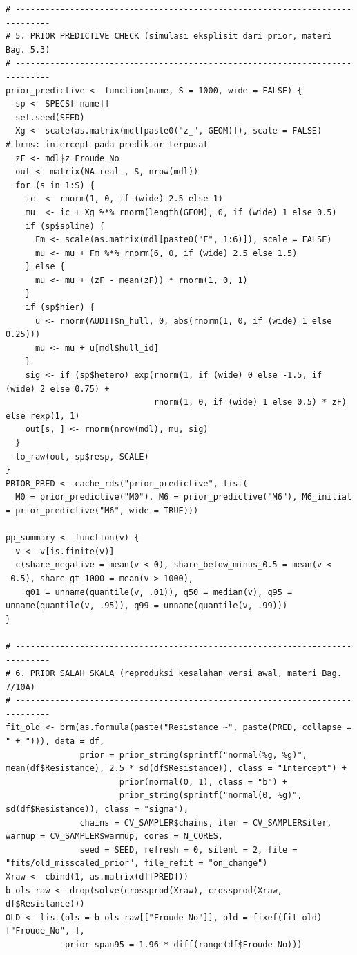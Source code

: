 \documentclass[
]{article}
\begin{document}
\begin{verbatim}
# -----------------------------------------------------------------------------
# 5. PRIOR PREDICTIVE CHECK (simulasi eksplisit dari prior, materi Bag. 5.3)
# -----------------------------------------------------------------------------
prior_predictive <- function(name, S = 1000, wide = FALSE) {
  sp <- SPECS[[name]]
  set.seed(SEED)
  Xg <- scale(as.matrix(mdl[paste0("z_", GEOM)]), scale = FALSE)          # brms: intercept pada prediktor terpusat
  zF <- mdl$z_Froude_No
  out <- matrix(NA_real_, S, nrow(mdl))
  for (s in 1:S) {
    ic  <- rnorm(1, 0, if (wide) 2.5 else 1)
    mu  <- ic + Xg %*% rnorm(length(GEOM), 0, if (wide) 1 else 0.5)
    if (sp$spline) {
      Fm <- scale(as.matrix(mdl[paste0("F", 1:6)]), scale = FALSE)
      mu <- mu + Fm %*% rnorm(6, 0, if (wide) 2.5 else 1.5)
    } else {
      mu <- mu + (zF - mean(zF)) * rnorm(1, 0, 1)
    }
    if (sp$hier) {
      u <- rnorm(AUDIT$n_hull, 0, abs(rnorm(1, 0, if (wide) 1 else 0.25)))
      mu <- mu + u[mdl$hull_id]
    }
    sig <- if (sp$hetero) exp(rnorm(1, if (wide) 0 else -1.5, if (wide) 2 else 0.75) +
                              rnorm(1, 0, if (wide) 1 else 0.5) * zF) else rexp(1, 1)
    out[s, ] <- rnorm(nrow(mdl), mu, sig)
  }
  to_raw(out, sp$resp, SCALE)
}
PRIOR_PRED <- cache_rds("prior_predictive", list(
  M0 = prior_predictive("M0"), M6 = prior_predictive("M6"), M6_initial = prior_predictive("M6", wide = TRUE)))

pp_summary <- function(v) {
  v <- v[is.finite(v)]
  c(share_negative = mean(v < 0), share_below_minus_0.5 = mean(v < -0.5), share_gt_1000 = mean(v > 1000),
    q01 = unname(quantile(v, .01)), q50 = median(v), q95 = unname(quantile(v, .95)), q99 = unname(quantile(v, .99)))
}

# -----------------------------------------------------------------------------
# 6. PRIOR SALAH SKALA (reproduksi kesalahan versi awal, materi Bag. 7/10A)
# -----------------------------------------------------------------------------
fit_old <- brm(as.formula(paste("Resistance ~", paste(PRED, collapse = " + "))), data = df,
               prior = prior_string(sprintf("normal(%g, %g)", mean(df$Resistance), 2.5 * sd(df$Resistance)), class = "Intercept") +
                       prior(normal(0, 1), class = "b") +
                       prior_string(sprintf("normal(0, %g)", sd(df$Resistance)), class = "sigma"),
               chains = CV_SAMPLER$chains, iter = CV_SAMPLER$iter, warmup = CV_SAMPLER$warmup, cores = N_CORES,
               seed = SEED, refresh = 0, silent = 2, file = "fits/old_misscaled_prior", file_refit = "on_change")
Xraw <- cbind(1, as.matrix(df[PRED]))
b_ols_raw <- drop(solve(crossprod(Xraw), crossprod(Xraw, df$Resistance)))
OLD <- list(ols = b_ols_raw[["Froude_No"]], old = fixef(fit_old)["Froude_No", ],
            prior_span95 = 1.96 * diff(range(df$Froude_No)))


\end{verbatim}
\end{document}

